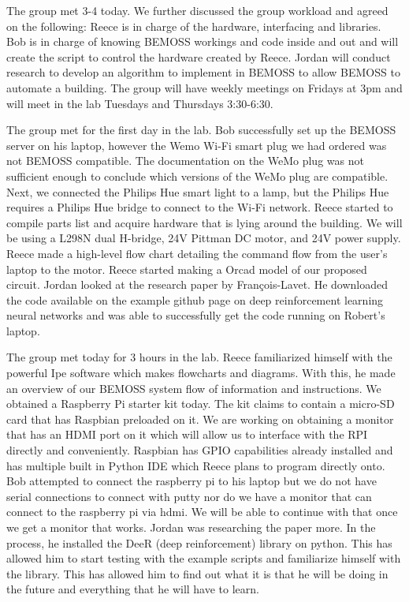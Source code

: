 \documentclass[fontsize=11pt, %
                             paper=letter, %
                             twoside, %
                             captions=tableheading,
                             index=totoc,
                             hyperref]{labbook}
\begin{document}
The group met 3-4 today. We further discussed the group workload and agreed on the following: Reece is in charge of the hardware, interfacing and libraries. Bob is in charge of knowing BEMOSS workings and code inside and out and will create the script to control the hardware created by Reece. Jordan will conduct research to develop an algorithm to implement in BEMOSS to allow BEMOSS to automate a building. 
\newline The group will have weekly meetings on Fridays at 3pm and will meet in the lab Tuesdays and Thursdays 3:30-6:30. 

The group met for the first day in the lab. Bob successfully set up the BEMOSS server on his laptop, however the Wemo Wi-Fi smart plug we had ordered was not BEMOSS compatible. The documentation on the WeMo plug was not sufficient enough to conclude which versions of the WeMo plug are compatible. Next, we connected the Philips Hue smart light to a lamp, but the Philips Hue requires a Philips Hue bridge to connect to the Wi-Fi network. Reece started to compile parts list and acquire hardware that is lying around the building. We will be using a L298N dual H-bridge, 24V Pittman DC motor, and 24V power supply. Reece made a high-level flow chart detailing the command flow from the user's laptop to the motor. Reece started making a Orcad model of our proposed circuit.
\newline Jordan looked at the research paper by François-Lavet. He downloaded the code available on the example github page on deep reinforcement learning neural networks and was able to successfully get the code running on Robert's laptop.

The group met today for 3 hours in the lab. Reece familiarized himself with the powerful Ipe software which makes flowcharts and diagrams. With this, he made an overview of our BEMOSS system flow of information and instructions. 
\newline We obtained a Raspberry Pi starter kit today. The kit claims to contain a micro-SD card that has Raspbian preloaded on it. We are working on obtaining a monitor that has an HDMI port on it which will allow us to interface with the RPI directly and conveniently. Raspbian has GPIO capabilities already installed and has multiple built in Python IDE which Reece plans to program directly onto. Bob attempted to connect the raspberry pi to his laptop but we do not have serial connections to connect with putty nor do we have a monitor that can connect to the raspberry pi via hdmi. We will be able to continue with that once we get a monitor that works. Jordan was researching the paper more. In the process, he installed the DeeR (deep reinforcement) library on python. This has allowed him to start testing with the example scripts and familiarize himself with the library. This has allowed him to find out what it is that he will be doing in the future and everything that he will have to learn.
\end{document}
